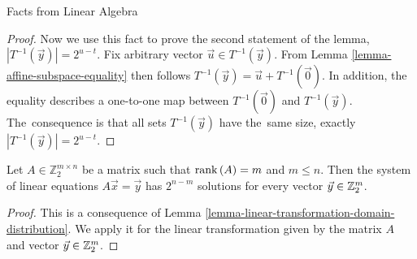 \begin{chapter}{Facts from Linear Algebra}
\begin{proof}
Now we use this fact to prove the second statement of the lemma, $|T^{-1}(\vec{y})| = 2 ^ {u - t}$. Fix arbitrary vector $\vec{u} \in T^{-1}(\vec{y})$. From Lemma \ref{lemma-affine-subspace-equality} then follows $T^{-1}(\vec{y}) = \vec{u} + T^{-1}(\vec{0})$. In addition, the equality describes a one-to-one map between $T^{-1}(\vec{0})$ and $T^{-1}(\vec{y})$. The~consequence is that all sets $T^{-1}(\vec{y})$ have the~same size, exactly $|T^{-1}(\vec{y})| = 2^{u-t}$.
\end{proof}

\begin{lemma}
\label{lemma-system-of-linear-equations-solution-count}
Let $A \in \mathbb{Z}_2^{m \times n}$ be a matrix such that $\mathrm{rank}\left({A}\right) = m$ and $m \leq n$. Then the system of linear equations $A\vec{x} = \vec{y}$ has $2 ^ {n - m}$ solutions for every vector $\vec{y} \in \mathbb{Z}_{2}^{m}$.
\end{lemma}
\begin{proof}
This is a consequence of Lemma \ref{lemma-linear-transformation-domain-distribution}. We apply it for the linear transformation given by the matrix $A$ and vector $\vec{y} \in \mathbb{Z}_{2}^{m}$.



\end{proof}
\end{chapter}
